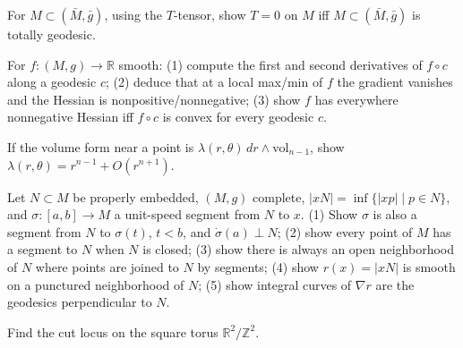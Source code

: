 \begin{remark}
  \label{rem:pet-ch5-ex-20}
  For $M\subset(\bar M,\bar g)$, using the $T$-tensor, show $T=0$ on $M$ iff
  $M\subset(\bar M,\bar g)$ is totally geodesic.
\end{remark}

\begin{remark}
  \label{rem:pet-ch5-ex-21}
  For $f:(M,g)\to\mathbb R$ smooth: (1) compute the first and second derivatives of
  $f\circ c$ along a geodesic $c$; (2) deduce that at a local max/min of $f$ the
  gradient vanishes and the Hessian is nonpositive/nonnegative; (3) show $f$ has
  everywhere nonnegative Hessian iff $f\circ c$ is convex for every geodesic $c$.
\end{remark}

\begin{remark}
  \label{rem:pet-ch5-ex-22}
  If the volume form near a point is $\lambda(r,\theta)\,dr\wedge\mathrm{vol}_{n-1}$,
  show $\lambda(r,\theta)=r^{n-1}+O(r^{n+1})$.
\end{remark}

\begin{remark}
  \label{rem:pet-ch5-ex-23}
  Let $N\subset M$ be properly embedded, $(M,g)$ complete, $|xN|=\inf\{|xp|\mid
  p\in N\}$, and $\sigma:[a,b]\to M$ a unit-speed segment from $N$ to $x$. (1) Show
  $\sigma$ is also a segment from $N$ to $\sigma(t)$, $t<b$, and $\dot\sigma(a)\perp
  N$; (2) show every point of $M$ has a segment to $N$ when $N$ is closed; (3) show
  there is always an open neighborhood of $N$ where points are joined to $N$ by
  segments; (4) show $r(x)=|xN|$ is smooth on a punctured neighborhood of $N$; (5)
  show integral curves of $\nabla r$ are the geodesics perpendicular to $N$.
\end{remark}

\begin{remark}
  \label{rem:pet-ch5-ex-24}
  Find the cut locus on the square torus $\mathbb R^2/\mathbb Z^2$.
\end{remark}

